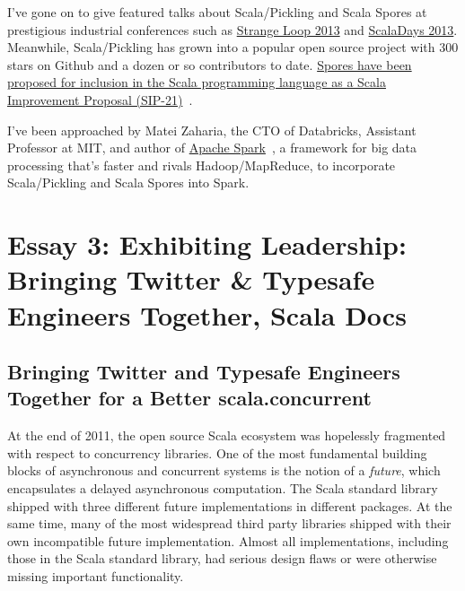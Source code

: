 \documentclass[acmtocl]{acmtrans2m}
\begin{document}
I've gone on to give featured talks about Scala/Pickling and Scala Spores at
prestigious industrial conferences such as
\href{http://www.infoq.com/presentations/scala-pickles-spores}{Strange Loop
2013} and \href{http://parleys.com/play/51c3799fe4b0d38b54f4625a}{ScalaDays
2013}. Meanwhile, Scala/Pickling has grown into a popular open source project
with 300 stars on Github and a dozen or so contributors to date.
\href{http://docs.scala-lang.org/sips/pending/spores.html}{Spores have been
proposed for inclusion in the Scala programming language as a Scala
Improvement Proposal (SIP-21)}~\cite{Spores}.

I've been approached by Matei Zaharia, the CTO of Databricks, Assistant
Professor at MIT, and author of
\href{https://spark.incubator.apache.org/}{Apache Spark}~\cite{Spark}, a
framework for big data processing that's faster and rivals Hadoop/MapReduce,
to incorporate Scala/Pickling and Scala Spores into Spark.


\section*{\textbf{Essay 3:} Exhibiting Leadership: Bringing Twitter \& Typesafe Engineers Together, Scala Docs}


\vspace{-0.1in}
\subsection*{\textbf{Bringing Twitter and Typesafe Engineers Together for a Better scala.concurrent}}
\vspace{-0.1in}

At the end of 2011, the open source Scala ecosystem was hopelessly fragmented
with respect to concurrency libraries. One of the most fundamental building
blocks of asynchronous and concurrent systems is the notion of a
\textit{future}, which encapsulates a delayed asynchronous computation. The
Scala standard library shipped with three different future implementations in
different packages. At the same time, many of the most widespread third party
libraries shipped with their own incompatible future implementation. Almost
all implementations, including those in the Scala standard library, had
serious design flaws or were otherwise missing important functionality.
\end{document}
